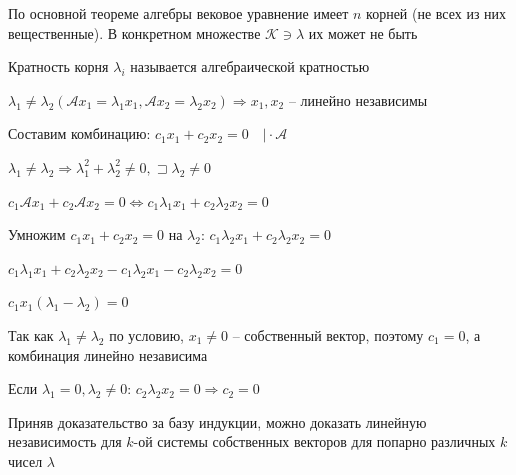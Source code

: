 \documentclass[12pt]{article}
\begin{document}
    \Nota По основной теореме алгебры вековое уравнение имеет $n$ корней (не всех из них вещественные).
    В конкретном множестве $\mathcal{K} \ni \lambda$ их может не быть

    \Def Кратность корня $\lambda_i$ называется алгебраической кратностью

    \begin{MyTheorem}
        \Ths $\lambda_1 \neq \lambda_2 (\mathcal{A}x_1 = \lambda_1 x_1, \mathcal{A}x_2 = \lambda_2 x_2) \Longrightarrow x_1, x_2$ -- линейно независимы
    \end{MyTheorem}

    \begin{MyProof}
        Составим комбинацию: $c_1 x_1 + c_2 x_2 = 0 \quad \Big| \cdot \mathcal{A}$

        $\lambda_1 \neq \lambda_2 \Longrightarrow \lambda_1^2 + \lambda_2^2 \neq 0, \sqsupset \lambda_2 \neq 0$

        $c_1 \mathcal{A} x_1 + c_2 \mathcal{A} x_2 = 0 \Longleftrightarrow c_1 \lambda_1 x_1 + c_2 \lambda_2 x_2 = 0$

        Умножим $c_1 x_1 + c_2 x_2 = 0$ на $\lambda_2$: $c_1 \lambda_2 x_1 + c_2 \lambda_2 x_2 = 0$

        $c_1 \lambda_1 x_1 + c_2 \lambda_2 x_2 - c_1 \lambda_2 x_1 - c_2 \lambda_2 x_2 = 0$

        $c_1 x_1(\lambda_1 - \lambda_2) = 0$

        Так как $\lambda_1 \neq \lambda_2$ по условию, $x_1 \neq 0$ -- собственный вектор, поэтому $c_1 = 0$, а комбинация линейно независима

        Если $\lambda_1 = 0, \lambda_2 \neq 0$: $c_2 \lambda_2 x_2 = 0 \Longrightarrow c_2 = 0$
    \end{MyProof}

    \Nota Приняв доказательство за базу индукции, можно доказать линейную независимость для $k$-ой системы собственных векторов для попарно различных $k$ чисел $\lambda$
\end{document}
